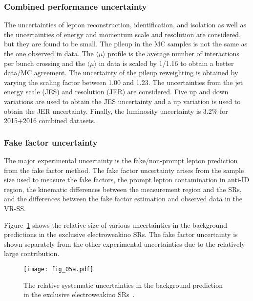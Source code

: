 
\subsubsection{Combined performance uncertainty}
\label{subsubsec:bkg_combined_performance uncertainty}
The uncertainties of lepton reconstruction, identification, and isolation as well as the uncertainties of energy and momentum scale and resolution are considered, but they are found to be small.
The pileup in the MC samples is not the same as the one observed in data.
The $\langle \mu \rangle$ profile is the average number of interactions per bunch crossing and the $\langle \mu \rangle$ in data is scaled by 1/1.16 to obtain a better data/MC agreement.
The uncertainty of the pileup reweighting is obtained by varying the scaling factor between 1.00 and 1.23.
The uncertainties from the jet energy scale (JES) and resolution (JER) are considered.
Five up and down variations are used to obtain the JES uncertainty and a up variation is used to obtain the JER uncertainty.
Finally, the luminosity uncertainty is 3.2\% for 2015+2016 combined datasets.


\subsubsection{Fake factor uncertainty}
\label{subsubsec:bkg_fake_factor_uncertainty}
The major experimental uncertainty is the fake/non-prompt lepton prediction from the fake factor method.
The fake factor uncertainty arises from the sample size used to measure the fake factors, the prompt lepton contamination in anti-ID region, the kinematic differences between the measurement region and the SRs, and the differences between the fake factor estimation and observed data in the VR-SS.

Figure~\ref{fig:bkg_relative_systematic_uncertainties} shows the relative size of various uncertainties in the background predictions in the exclusive electroweakino SRs.
The fake factor uncertainty is shown separately from the other experimental uncertainties due to the relatively large contribution.

\begin{figure}[htbp]
    \begin{center}
        \texttt{[image: fig\_05a.pdf]}
        \caption{The relative systematic uncertainties in the background prediction in the exclusive electroweakino SRs~\cite{Aaboud:2017leg}.}
        \label{fig:bkg_relative_systematic_uncertainties}
    \end{center}
\end{figure}
